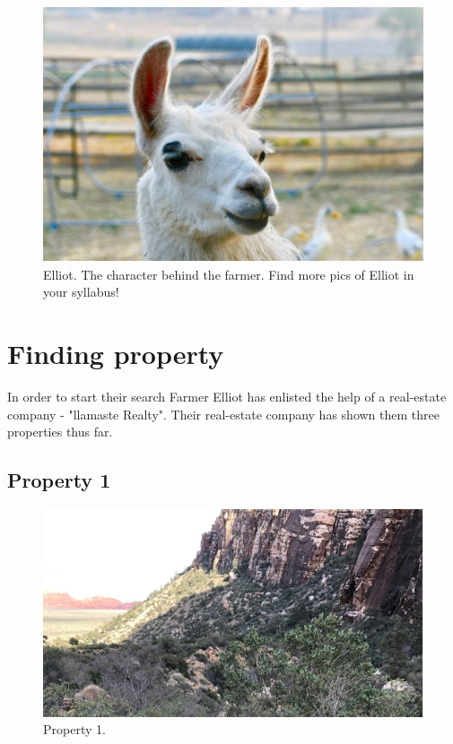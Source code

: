\documentclass[
]{book}
\begin{document}
\begin{figure}
\centering
\includegraphics{images/img-2.png}
\caption{Elliot. The character behind the farmer. Find more pics of Elliot in your syllabus!}
\end{figure}

\hypertarget{finding-property}{%
\section*{Finding property}\label{finding-property}}

In order to start their search Farmer Elliot has enlisted the help of a real-estate company - "llamaste Realty". Their real-estate company has shown them three properties thus far.

\hypertarget{property-1}{%
\subsection*{Property 1}\label{property-1}}

\begin{figure}
\centering
\includegraphics{images/prop-1.png}
\caption{Property 1.}
\end{figure}
\end{document}
